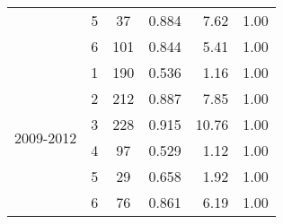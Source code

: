 \begin{table}
\begin{tabular}{rrcrrr}
    \multicolumn{1}{c}{} & \multicolumn{1}{c}{5} & \multicolumn{1}{c}{37} & \multicolumn{1}{c}{0.884 } & \multicolumn{1}{r}{7.62 } & \multicolumn{1}{c}{1.00 } \\
    \multicolumn{1}{c}{} & \multicolumn{1}{c}{6} & \multicolumn{1}{c}{101} & \multicolumn{1}{c}{0.844 } & \multicolumn{1}{r}{5.41 } & \multicolumn{1}{c}{1.00 } \\\midrule
    \multicolumn{1}{c}{\multirow{6}[2]{*}{\begin{sideways}2009-2012\end{sideways}}} & \multicolumn{1}{c}{1} & \multicolumn{1}{r}{190} & \multicolumn{1}{c}{0.536 } & \multicolumn{1}{r}{1.16 } & \multicolumn{1}{c}{1.00 } \\
    \multicolumn{1}{c}{} & \multicolumn{1}{c}{2} & \multicolumn{1}{c}{212} & \multicolumn{1}{c}{0.887 } & \multicolumn{1}{r}{7.85 } & \multicolumn{1}{c}{1.00 } \\
    \multicolumn{1}{c}{} & \multicolumn{1}{c}{3} & \multicolumn{1}{c}{228} & \multicolumn{1}{c}{0.915 } & \multicolumn{1}{r}{10.76 } & \multicolumn{1}{c}{1.00 } \\
    \multicolumn{1}{c}{} & \multicolumn{1}{c}{4} & \multicolumn{1}{c}{97} & \multicolumn{1}{c}{0.529 } & \multicolumn{1}{r}{1.12 } & \multicolumn{1}{c}{1.00 } \\
    \multicolumn{1}{c}{} & \multicolumn{1}{c}{5} & \multicolumn{1}{c}{29} & \multicolumn{1}{c}{0.658 } & \multicolumn{1}{r}{1.92 } & \multicolumn{1}{c}{1.00 } \\
    \multicolumn{1}{c}{} & \multicolumn{1}{c}{6} & \multicolumn{1}{c}{76} & \multicolumn{1}{c}{0.861 } & \multicolumn{1}{r}{6.19 } & \multicolumn{1}{c}{1.00 } \\
    \bottomrule
    \end{tabular}%
  \label{tab:SO4SWPHPA}%
\end{table}%
